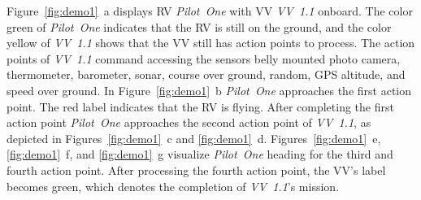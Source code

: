 Figure~\ref{fig:demo1}~a displays \ac{RV} \textit{Pilot~One} with \ac{VV} \textit{VV~1.1} onboard.
The color green of \textit{Pilot~One} indicates that the \ac{RV} is still on the ground, and the
color yellow of \textit{VV~1.1} shows that the \ac{VV} still has action points to process.
The action points of \textit{VV~1.1} command accessing the sensors belly mounted photo camera, thermometer,
barometer, sonar, course over ground, random, GPS altitude, and speed over ground. 
In Figure~\ref{fig:demo1}~b \textit{Pilot~One} approaches the first action point. The red label indicates
that the \ac{RV} is flying. After completing the first action point \textit{Pilot~One} approaches the
second action point of \textit{VV~1.1}, as depicted in Figures~\ref{fig:demo1}~c and \ref{fig:demo1}~d.
Figures~\ref{fig:demo1}~e, \ref{fig:demo1}~f, and \ref{fig:demo1}~g visualize \textit{Pilot~One} heading
for the third and fourth action point. After processing the fourth action point, the \ac{VV}'s label
becomes green, which denotes the completion of \textit{VV~1.1}'s mission.


